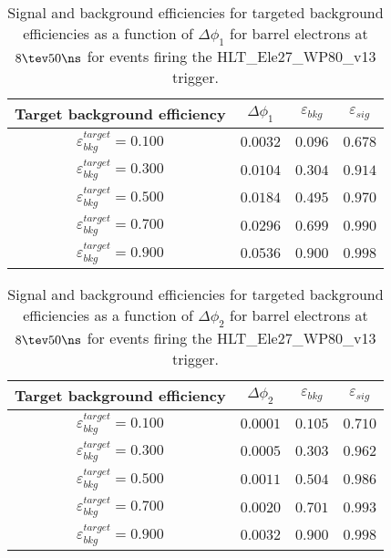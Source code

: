 \clearpage

\begin{table}[!bht]
  \begin{center}
    \begin{tabular}{cccc}
      \hline
      Target background efficiency & $\Delta\phi_1$ & $\varepsilon_{bkg}$ & $\varepsilon_{sig}$ \\ 
      \hline
      $\varepsilon_{bkg}^{target} = 0.100$ & $  0.0032$ & $0.096$ & $0.678$ \\
      $\varepsilon_{bkg}^{target} = 0.300$ & $  0.0104$ & $0.304$ & $0.914$ \\
      $\varepsilon_{bkg}^{target} = 0.500$ & $  0.0184$ & $0.495$ & $0.970$ \\
      $\varepsilon_{bkg}^{target} = 0.700$ & $  0.0296$ & $0.699$ & $0.990$ \\
      $\varepsilon_{bkg}^{target} = 0.900$ & $  0.0536$ & $0.900$ & $0.998$ \\
      \hline
    \end{tabular}
    \caption{Signal and background efficiencies for targeted background efficiencies as a function of $\Delta\phi_1$ for barrel electrons at $8\tev 50\ns$ for events firing the HLT\_Ele27\_WP80\_v13 trigger.}
    \label{tab:eff_rej_phi1_beam_8_50_trigger_27_B}
  \end{center}
\end{table}

\clearpage

\begin{table}[!bht]
  \begin{center}
    \begin{tabular}{cccc}
      \hline
      Target background efficiency & $\Delta\phi_2$ & $\varepsilon_{bkg}$ & $\varepsilon_{sig}$ \\ 
      \hline
      $\varepsilon_{bkg}^{target} = 0.100$ & $  0.0001$ & $0.105$ & $0.710$ \\
      $\varepsilon_{bkg}^{target} = 0.300$ & $  0.0005$ & $0.303$ & $0.962$ \\
      $\varepsilon_{bkg}^{target} = 0.500$ & $  0.0011$ & $0.504$ & $0.986$ \\
      $\varepsilon_{bkg}^{target} = 0.700$ & $  0.0020$ & $0.701$ & $0.993$ \\
      $\varepsilon_{bkg}^{target} = 0.900$ & $  0.0032$ & $0.900$ & $0.998$ \\
      \hline
    \end{tabular}
    \caption{Signal and background efficiencies for targeted background efficiencies as a function of $\Delta\phi_2$ for barrel electrons at $8\tev 50\ns$ for events firing the HLT\_Ele27\_WP80\_v13 trigger.}
    \label{tab:eff_rej_phi2_beam_8_50_trigger_27_B}
  \end{center}
\end{table}

